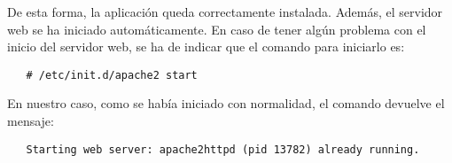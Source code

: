    De esta forma, la aplicación queda correctamente instalada. Además, el
   servidor web se ha iniciado automáticamente. En caso de tener algún problema
   con el inicio del servidor web, se ha de indicar que el comando para
   iniciarlo es:

   \begin{verbatim}
   # /etc/init.d/apache2 start
   \end{verbatim}

   En nuestro caso, como se había iniciado con normalidad, el comando devuelve
   el mensaje:

   \begin{verbatim}
   Starting web server: apache2httpd (pid 13782) already running.
   \end{verbatim}


